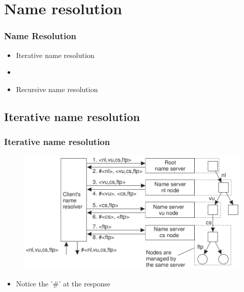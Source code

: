 \documentclass{beamer}
\begin{document}
	
\section{Name resolution}
	\begin{frame}
		\frametitle{Name Resolution}
		
			\begin{itemize}
			\item Iterative name resolution
			\item[]
			\item Recursive name resolution
			\end{itemize}
		
	\end{frame}
	
\subsection{Iterative name resolution}
	\begin{frame}
		\frametitle{Iterative name resolution}
		
		\begin{figure}[hbtp]
		\centering
		\includegraphics[scale=0.45]{iterativ}
		\end{figure}
		
		
			\begin{itemize}
			\item Notice the '\#' at the response
			\end{itemize}
		
		
	\end{frame}
	
\end{document}
